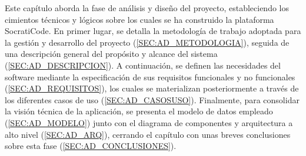 Este capítulo aborda la fase de análisis y diseño del proyecto, estableciendo los cimientos técnicos y lógicos sobre los cuales se ha construido la plataforma SocratiCode. En primer lugar, se detalla la metodología de trabajo adoptada para la gestión y desarrollo del proyecto (\autoref{SEC:AD_METODOLOGIA}), seguida de una descripción general del propósito y alcance del sistema (\autoref{SEC:AD_DESCRIPCION}). A continuación, se definen las necesidades del software mediante la especificación de sus requisitos funcionales y no funcionales (\autoref{SEC:AD_REQUISITOS}), los cuales se materializan posteriormente a través de los diferentes casos de uso (\autoref{SEC:AD_CASOSUSO}). Finalmente, para consolidar la visión técnica de la aplicación, se presenta el modelo de datos empleado (\autoref{SEC:AD_MODELO}) junto con el diagrama de componentes y arquitectura a alto nivel (\autoref{SEC:AD_ARQ}), cerrando el capítulo con unas breves conclusiones sobre esta fase (\autoref{SEC:AD_CONCLUSIONES}).
